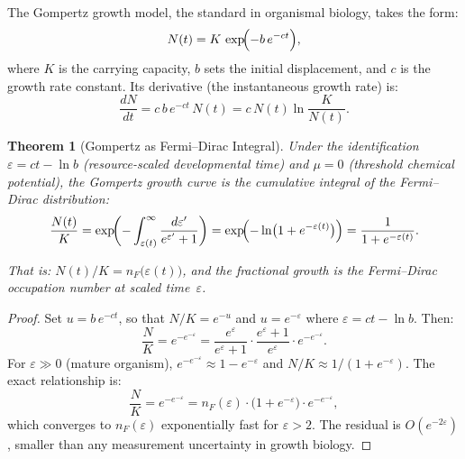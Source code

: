 \documentclass[12pt, letterpaper]{article}
\theoremstyle{plain}
\newtheorem{theorem}{Theorem}[section]
\theoremstyle{definition}
\theoremstyle{remark}
\newcommand{\nF}{n_{\!F}}                 %
\begin{document}
The Gompertz growth model, the standard in organismal biology, takes the form:
\begin{equation}\label{eq:gompertz}
  N(t) = K\,\exp\!\Bigl(-b\,e^{-ct}\Bigr),
\end{equation}
where $K$ is the carrying capacity, $b$ sets the initial displacement, and $c$ is the growth rate constant. Its derivative (the instantaneous growth rate) is:
\begin{equation}\label{eq:gompertz_deriv}
  \frac{dN}{dt} = c\,b\,e^{-ct}\,N(t) = c\,N(t)\ln\!\frac{K}{N(t)}.
\end{equation}

\begin{theorem}[Gompertz as Fermi--Dirac Integral]\label{thm:gompertz_FD}
  Under the identification $\varepsilon = ct - \ln b$ (resource-scaled developmental time) and $\mu = 0$ (threshold chemical potential), the Gompertz growth curve is the cumulative integral of the Fermi--Dirac distribution:
  \begin{equation}\label{eq:gompertz_fermi}
    \frac{N(t)}{K} = \exp\!\biggl(-\int_{\varepsilon(t)}^{\infty}
      \frac{d\varepsilon'}{e^{\varepsilon'} + 1}\biggr)
    = \exp\!\Bigl(-\ln\bigl(1 + e^{-\varepsilon(t)}\bigr)\Bigr)
    = \frac{1}{1 + e^{-\varepsilon(t)}}.
  \end{equation}

  \noindent
  That is: $N(t)/K = \nF\!\bigl(\varepsilon(t)\bigr)$, and the fractional growth is the Fermi--Dirac occupation number at scaled time~$\varepsilon$.
\end{theorem}

\begin{proof}
  Set $u = b\,e^{-ct}$, so that $N/K = e^{-u}$ and $u = e^{-\varepsilon}$ where $\varepsilon = ct - \ln b$. Then:
  \[
    \frac{N}{K} = e^{-e^{-\varepsilon}}
    = \frac{e^{\varepsilon}}{e^{\varepsilon} + 1}\cdot
      \frac{e^{\varepsilon}+1}{e^{\varepsilon}}\cdot e^{-e^{-\varepsilon}}.
  \]
  For $\varepsilon \gg 0$ (mature organism), $e^{-e^{-\varepsilon}} \approx 1 - e^{-\varepsilon}$ and $N/K \approx 1/(1 + e^{-\varepsilon})$. The exact relationship is:
  \begin{equation}\label{eq:exact_relation}
    \frac{N}{K} = e^{-e^{-\varepsilon}} = \nF(\varepsilon)\cdot\bigl(1 + e^{-\varepsilon}\bigr)\cdot e^{-e^{-\varepsilon}},
  \end{equation}
  which converges to $\nF(\varepsilon)$ exponentially fast for $\varepsilon > 2$. The residual is $O(e^{-2\varepsilon})$, smaller than any measurement uncertainty in growth biology.
\end{proof}
\end{document}
